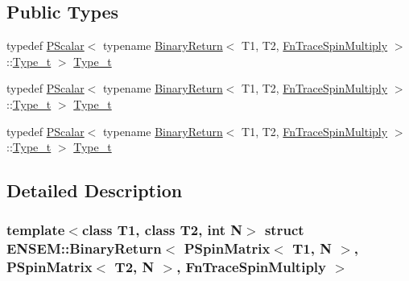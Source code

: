 \subsection*{Public Types}
\begin{DoxyCompactItemize}
\item 
typedef \mbox{\hyperlink{classENSEM_1_1PScalar}{P\+Scalar}}$<$ typename \mbox{\hyperlink{structENSEM_1_1BinaryReturn}{Binary\+Return}}$<$ T1, T2, \mbox{\hyperlink{structENSEM_1_1FnTraceSpinMultiply}{Fn\+Trace\+Spin\+Multiply}} $>$\+::\mbox{\hyperlink{structENSEM_1_1BinaryReturn_3_01PSpinMatrix_3_01T1_00_01N_01_4_00_01PSpinMatrix_3_01T2_00_01N_01fe1ad0c4fbb2ea3b6d703682cfed6045_a66286a845d3a1b506d5d5116c7e3e2a1}{Type\+\_\+t}} $>$ \mbox{\hyperlink{structENSEM_1_1BinaryReturn_3_01PSpinMatrix_3_01T1_00_01N_01_4_00_01PSpinMatrix_3_01T2_00_01N_01fe1ad0c4fbb2ea3b6d703682cfed6045_a66286a845d3a1b506d5d5116c7e3e2a1}{Type\+\_\+t}}
\item 
typedef \mbox{\hyperlink{classENSEM_1_1PScalar}{P\+Scalar}}$<$ typename \mbox{\hyperlink{structENSEM_1_1BinaryReturn}{Binary\+Return}}$<$ T1, T2, \mbox{\hyperlink{structENSEM_1_1FnTraceSpinMultiply}{Fn\+Trace\+Spin\+Multiply}} $>$\+::\mbox{\hyperlink{structENSEM_1_1BinaryReturn_3_01PSpinMatrix_3_01T1_00_01N_01_4_00_01PSpinMatrix_3_01T2_00_01N_01fe1ad0c4fbb2ea3b6d703682cfed6045_a66286a845d3a1b506d5d5116c7e3e2a1}{Type\+\_\+t}} $>$ \mbox{\hyperlink{structENSEM_1_1BinaryReturn_3_01PSpinMatrix_3_01T1_00_01N_01_4_00_01PSpinMatrix_3_01T2_00_01N_01fe1ad0c4fbb2ea3b6d703682cfed6045_a66286a845d3a1b506d5d5116c7e3e2a1}{Type\+\_\+t}}
\item 
typedef \mbox{\hyperlink{classENSEM_1_1PScalar}{P\+Scalar}}$<$ typename \mbox{\hyperlink{structENSEM_1_1BinaryReturn}{Binary\+Return}}$<$ T1, T2, \mbox{\hyperlink{structENSEM_1_1FnTraceSpinMultiply}{Fn\+Trace\+Spin\+Multiply}} $>$\+::\mbox{\hyperlink{structENSEM_1_1BinaryReturn_3_01PSpinMatrix_3_01T1_00_01N_01_4_00_01PSpinMatrix_3_01T2_00_01N_01fe1ad0c4fbb2ea3b6d703682cfed6045_a66286a845d3a1b506d5d5116c7e3e2a1}{Type\+\_\+t}} $>$ \mbox{\hyperlink{structENSEM_1_1BinaryReturn_3_01PSpinMatrix_3_01T1_00_01N_01_4_00_01PSpinMatrix_3_01T2_00_01N_01fe1ad0c4fbb2ea3b6d703682cfed6045_a66286a845d3a1b506d5d5116c7e3e2a1}{Type\+\_\+t}}
\end{DoxyCompactItemize}


\subsection{Detailed Description}
\subsubsection*{template$<$class T1, class T2, int N$>$\newline
struct E\+N\+S\+E\+M\+::\+Binary\+Return$<$ P\+Spin\+Matrix$<$ T1, N $>$, P\+Spin\+Matrix$<$ T2, N $>$, Fn\+Trace\+Spin\+Multiply $>$}

